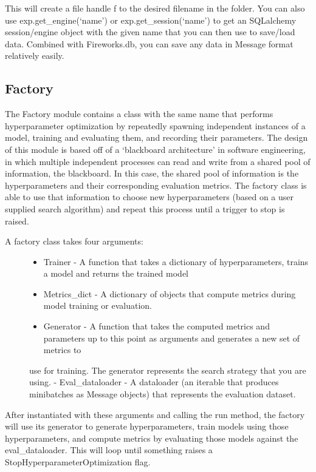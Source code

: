 \documentclass[letterpaper,10pt,english]{sphinxmanual}
\begin{document}
This will create a file handle f to the desired filename in the folder. You can also use exp.get\_engine(‘name’) or exp.get\_session(‘name’)
to get an SQLalchemy session/engine object with the given name that you can then use to save/load data. Combined with Fireworks.db, you can
save any data in Message format relatively easily.


\subsection{Factory}
\label{\detokenize{Fireworks:factory}}
The Factory module contains a class with the same name that performs hyperparameter optimization by repeatedly spawning independent instances
of a model, training and evaluating them, and recording their parameters. The design of this module is based off of a ‘blackboard architecture’
in software engineering, in which multiple independent processes can read and write from a shared pool of information, the blackboard. In this
case, the shared pool of information is the hyperparameters and their corresponding evaluation metrics. The factory class is able to use that
information to choose new hyperparameters (based on a user supplied search algorithm) and repeat this process until a trigger to stop is raised.
\begin{description}
\item[{A factory class takes four arguments:}] \leavevmode\begin{itemize}
\item {} 
Trainer - A function that takes a dictionary of hyperparameters,  trains a model and returns the trained model

\item {} 
Metrics\_dict - A dictionary of objects that compute metrics during model training or evaluation.

\item {} 
Generator - A function that takes the computed metrics and parameters up to this point as arguments and generates a new set of metrics to

\end{itemize}

use for training. The generator represents the search strategy that you are using.
- Eval\_dataloader - A dataloader (an iterable that produces minibatches as Message objects) that represents the evaluation dataset.

\end{description}

After instantiated with these arguments and calling the run method, the factory will use its generator to generate hyperparameters, train
models using those hyperparameters, and compute metrics by evaluating those models against the eval\_dataloader. This will loop until something
raises a StopHyperparameterOptimization flag.
\end{document}
